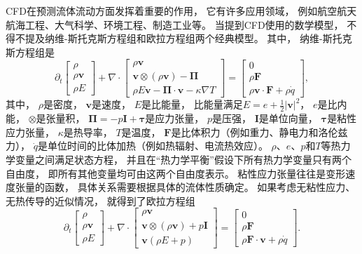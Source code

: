 CFD在预测流体流动方面发挥着重要的作用，
它有许多应用领域，
例如航空航天航海工程、大气科学、环境工程、制造工业等。
当提到CFD使用的数学模型，
不得不提及纳维-斯托克斯方程组和欧拉方程组两个经典模型。
其中，
纳维-斯托克斯方程组是
\begin{equation}
  {\partial_t}
  \begin{bmatrix} \rho \\ \rho {\bm v} \\ \rho E \end{bmatrix}
  +\nabla \cdot
  \begin{bmatrix} \rho {
    \bm v} \\ {\bm v} \otimes (\rho {\bm v})- {\bm\Pi} \\ \rho E{\bm v} - {\bm\Pi}\cdot{\bm v} - \kappa \nabla T\end{bmatrix}
  =
  \begin{bmatrix} 0 \\ \rho {\bm F} \\ \rho {\bm v} \cdot {\bm F} + \rho \dot{q} \end{bmatrix},
\end{equation}
其中，
$\rho$是密度，
${\bm v}$是速度，
$E$是比能量，
比能量满足$E = e + \frac{1}{2} |\bm v|^2$，
$e$是比内能，
$\otimes$是张量积，
${\bm \Pi} = -p \bm I + \bm\tau$是应力张量，
$p$是压强，
$\bm I$是单位向量，
$\bm\tau$是粘性应力张量，
$\kappa$是热导率，
$T$是温度，
$\bm F$是比体积力（例如重力、静电力和洛伦兹力），
$\dot q$是单位时间的比体加热（例如热辐射、电流热效应）。
$\rho$、$e$、$p$和$T$等热力学变量之间满足状态方程，
并且在“热力学平衡”假设下所有热力学变量只有两个自由度，
即所有其他变量均可由这两个自由度表示。
粘性应力张量往往是变形速度张量的函数，
具体关系需要根据具体的流体性质确定。
如果考虑无粘性应力、无热传导的近似情况，
就得到了欧拉方程组
\begin{equation}
  {\partial_t}
  \begin{bmatrix} \rho \\ \rho {\bm v} \\ \rho E \end{bmatrix}
  +\nabla \cdot
  \begin{bmatrix} \rho {
    \bm v} \\ {\bm v} \otimes (\rho {\bm v})+ p \bm I \\ {\bm v}(\rho E+p)\end{bmatrix}
  =
  \begin{bmatrix} 0 \\ \rho {\bm F} \\ \rho {\bm F} \cdot {\bm v} + \rho \dot{q} \end{bmatrix}.
\end{equation}
